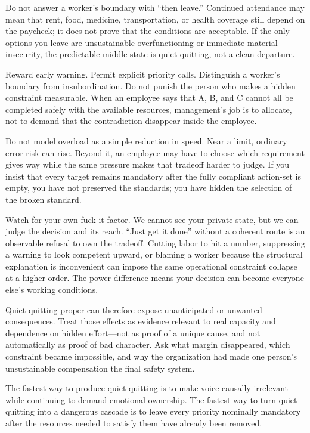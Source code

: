 \documentclass[11pt,oneside]{article}
\begin{document}
Do not answer a worker's boundary with ``then leave.'' Continued
attendance may mean that rent, food, medicine, transportation, or health
coverage still depend on the paycheck; it does not prove that the
conditions are acceptable. If the only options you leave are
unsustainable overfunctioning or immediate material insecurity, the
predictable middle state is quiet quitting, not a clean departure.

Reward early warning. Permit explicit priority calls. Distinguish a
worker's boundary from insubordination. Do not punish the person who
makes a hidden constraint measurable. When an employee says that A, B,
and C cannot all be completed safely with the available resources,
management's job is to allocate, not to demand that the contradiction
disappear inside the employee.

Do not model overload as a simple reduction in speed. Near a limit,
ordinary error risk can rise. Beyond it, an employee may have to choose
which requirement gives way while the same pressure makes that tradeoff
harder to judge. If you insist that every target remains mandatory after
the fully compliant action-set is empty, you have not preserved the
standards; you have hidden the selection of the broken standard.

Watch for your own fuck-it factor. We cannot see your private state, but
we can judge the decision and its reach. ``Just get it done'' without a
coherent route is an observable refusal to own the tradeoff. Cutting
labor to hit a number, suppressing a warning to look competent upward,
or blaming a worker because the structural explanation is inconvenient
can impose the same operational constraint collapse at a higher order.
The power difference means your decision can become everyone else's
working conditions.

Quiet quitting proper can therefore expose unanticipated or unwanted
consequences. Treat those effects as evidence relevant to real capacity
and dependence on hidden effort---not as proof of a unique cause, and
not automatically as proof of bad character. Ask what margin
disappeared, which constraint became impossible, and why the
organization had made one person's unsustainable compensation the final
safety system.

The fastest way to produce quiet quitting is to make voice causally
irrelevant while continuing to demand emotional ownership. The fastest
way to turn quiet quitting into a dangerous cascade is to leave every
priority nominally mandatory after the resources needed to satisfy them
have already been removed.
\end{document}
